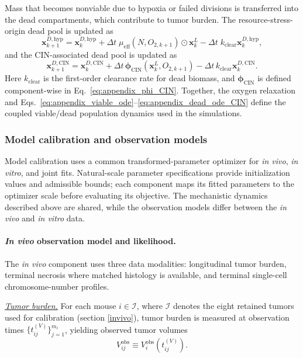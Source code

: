 \documentclass[11pt]{article}
\begin{document}
Mass that becomes nonviable due to hypoxia or failed divisions is transferred into the dead compartments, which contribute to tumor burden. The resource-stress-origin dead pool is updated as
\begin{equation}
\mathbf{x}^{D,\mathrm{hyp}}_{k+1}
=
\mathbf{x}^{D,\mathrm{hyp}}_{k}
+
\Delta t\;\mu_{\mathrm{eff}}(N,O_{2,k+1})\odot\mathbf{x}^{L}_{k}
-
\Delta t\;k_{\mathrm{clear}}\mathbf{x}^{D,\mathrm{hyp}}_{k},
\label{eq:appendix_dead_ode_hyp}
\end{equation}
and the CIN-associated dead pool is updated as
\begin{equation}
\mathbf{x}^{D,\mathrm{CIN}}_{k+1} = \mathbf{x}^{D,\mathrm{CIN}}_{k} + \Delta t \, \boldsymbol{\phi}_{\mathrm{CIN}}(\mathbf{x}^{L}_{k},O_{2,k+1}) - \Delta t \, k_{\mathrm{clear}}\mathbf{x}^{D,\mathrm{CIN}}_{k}.
\label{eq:appendix_dead_ode_CIN}
\end{equation}
Here $k_{\mathrm{clear}}$ is the first-order clearance rate for dead biomass, and $\boldsymbol{\phi}_{\mathrm{CIN}}$ is defined component-wise in Eq.~\eqref{eq:appendix_phi_CIN}. Together, the oxygen relaxation and Eqs.~\eqref{eq:appendix_viable_ode}--\eqref{eq:appendix_dead_ode_CIN} define the coupled viable/dead population dynamics used in the simulations.

\subsubsection{Model calibration and observation models}

Model calibration uses a common transformed-parameter optimizer for \textit{in vivo}, \textit{in vitro}, and joint fits. Natural-scale parameter specifications provide initialization values and admissible bounds; each component maps its fitted parameters to the optimizer scale before evaluating its objective. The mechanistic dynamics described above are shared, while the observation models differ between the \textit{in vivo} and \textit{in vitro} data.

\paragraph{\textit{In vivo} observation model and likelihood.}

The \textit{in vivo} component uses three data modalities: longitudinal tumor burden, terminal necrosis where matched histology is available, and terminal single-cell chromosome-number profiles.

\underline{\textit{Tumor burden.}} For each mouse $i\in\mathcal I$, where $\mathcal I$ denotes the eight retained tumors used for calibration (section \ref{invivo}), tumor burden is measured at observation times $\{t_{ij}^{(V)}\}_{j=1}^{m_i}$, yielding observed tumor volumes
\begin{equation}
V_{ij}^{\mathrm{obs}} \equiv V_i^{\mathrm{obs}}(t_{ij}^{(V)}).
\label{eq:appendix_observed_volume_definition}
\end{equation}
\end{document}

